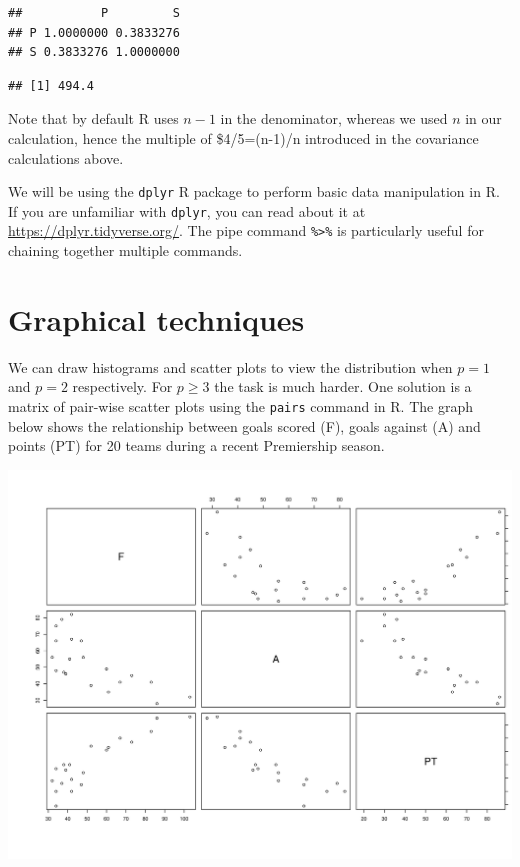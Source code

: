 \documentclass[]{book}
\newenvironment{Shaded}{\begin{snugshade}}{\end{snugshade}}
\newcommand{\DecValTok}[1]{\textcolor[rgb]{0.00,0.00,0.81}{#1}}
\newcommand{\KeywordTok}[1]{\textcolor[rgb]{0.13,0.29,0.53}{\textbf{#1}}}
\newcommand{\NormalTok}[1]{#1}
\newcommand{\OperatorTok}[1]{\textcolor[rgb]{0.81,0.36,0.00}{\textbf{#1}}}
\newcommand{\StringTok}[1]{\textcolor[rgb]{0.31,0.60,0.02}{#1}}
\theoremstyle{definition}
\theoremstyle{definition}
\theoremstyle{definition}
\theoremstyle{remark}
\begin{document}
\begin{verbatim}
##           P         S
## P 1.0000000 0.3833276
## S 0.3833276 1.0000000
\end{verbatim}

\begin{Shaded}
\end{Shaded}

\begin{verbatim}
## [1] 494.4
\end{verbatim}

Note that by default R uses \(n-1\) in the denominator, whereas we used \(n\) in our calculation, hence the multiple of \$4/5=(n-1)/n introduced in the covariance calculations above.

We will be using the \texttt{dplyr} R package to perform basic data manipulation in R.
If you are unfamiliar with \texttt{dplyr}, you can read about it at \url{https://dplyr.tidyverse.org/}.
The pipe command \texttt{\%\textgreater{}\%} is particularly useful for chaining together multiple commands.

\hypertarget{graphical-techniques}{%
\section{Graphical techniques}\label{graphical-techniques}}

We can draw histograms and scatter plots to view the distribution when \(p=1\) and \(p=2\) respectively. For \(p \geq 3\) the task is much harder. One solution is a matrix of pair-wise scatter plots using the \texttt{pairs} command in R. The graph below shows the relationship between goals scored (F), goals against (A) and points (PT) for 20 teams during a recent Premiership season.

\includegraphics{figs/pairs.png}
\end{document}
